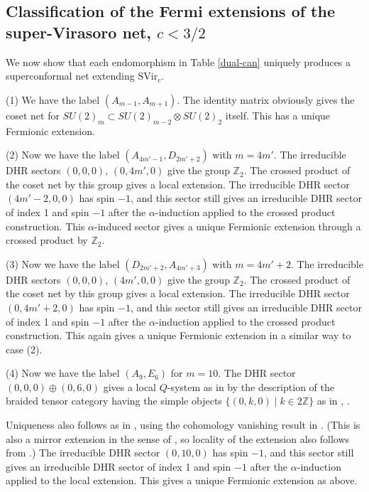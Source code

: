 \documentclass[11pt]{article}
\def\a{\alpha}
\def\SVir{{\mathrm {SVir}}}
\def\Z{{\mathbb Z}}
\begin{document}
\subsection{Classification of the Fermi extensions of the 
super-Vi\-ra\-so\-ro net, $c<3/2$}

We now show that each endomorphism in Table \ref{dual-can}
uniquely produces a superconformal net extending $\SVir_c$.

(1) We have the label $(A_{m-1}, A_{m+1})$.
The identity matrix obviously gives the coset net for
$SU(2)_m\subset SU(2)_{m-2}\otimes SU(2)_2$ itself.  This has
a unique Fermionic extension.

(2) Now we have the label $(A_{4m'-1}, D_{2m'+2})$ with $m=4m'$.
The irreducible DHR sectors $(0,0,0)$, $(0,4m',0)$ give the
group $\Z_2$.  The crossed product of the coset net by this group
gives a local extension.  The irreducible DHR sector $(4m'-2,0,0)$
has spin $-1$, and this sector still gives an irreducible DHR sector
of index 1 and spin $-1$ after the $\a$-induction applied to
the crossed product construction.
This $\a$-induced sector gives a unique Fermionic extension
through a crossed product by  $\Z_2$.

(3) Now we have the label $(D_{2m'+2}, A_{4m'+3})$ with $m=4m'+2$.
The irreducible DHR sectors $(0,0,0)$, $(4m',0,0)$ give the
group $\Z_2$.  The crossed product of the coset net by this group
gives a local extension.  The irreducible DHR sector $(0,4m'+2,0)$
has spin $-1$, and this sector still gives an irreducible DHR sector
of index 1 and spin $-1$ after the $\a$-induction applied to
the crossed product construction.
This again gives a unique Fermionic extension in a similar way to
case (2).

(4) Now we have the label $(A_9, E_6)$ for $m=10$.
The DHR sector  $(0,0,0)\oplus(0,6,0)$ gives a local
$Q$-system as in \cite[Subsection 4.2]{KL1}
by the description of the braided tensor category having
the simple objects $\{(0,k,0)\mid k\in2\Z\}$ as in
\cite[Section 4.3]{X1},
\cite[Proposition 2.3.1, Proof of Theorem B]{X5}.

Uniqueness also follows as in
\cite[Remark 2.5]{KL1}, using the cohomology vanishing result
in \cite{KL2}.
(This is also a mirror extension in the sense of \cite{X6}, so
locality of the extension also follows from \cite{X6}.)
The irreducible DHR sector $(0,10,0)$
has spin $-1$, and this sector still gives an irreducible DHR sector
of index 1 and spin $-1$ after the $\a$-induction applied to
the local extension.  This gives a unique Fermionic extension
as above.
\end{document}
